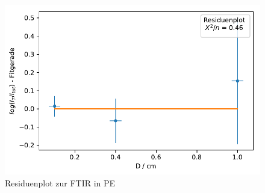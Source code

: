 \documentclass[12pt,a4paper]{article}
\begin{document}
\begin{figure}
	\centering
	\includegraphics[scale=1]{Bilder/FTIR_Residuen.pdf}
	\caption{Residuenplot zur FTIR in PE}
	\label{FTIR_Residuenplot}
\end{figure}
\end{document}
